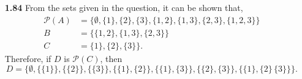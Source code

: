 \documentclass[12pt]{article}
\newcommand{\pow}[1]{ \mathcal{P}\left(#1\right) }
\begin{document}
\begin{itemize}
    \item[\bf{1.84}] From the sets given in the question, it can be shown that,
        \begin{align*}
            \pow{A} &=\{\emptyset,\{1\},\{2\},\{3\}, \{1,2\},\{1,3\},\{2,3\},\{1,2,3\}\} 
            \\
            B &=\{\{1,2\},\{1,3\},\{2,3\}\}
            \\
            C &=\{1\},\{2\},\{3\}\}.
        \end{align*}
    Therefore, if $D$ is $\pow{C}$, then
        \begin{equation*}
            D=\{\emptyset,\{\{1\}\},\{\{2\}\},\{\{3\}\},\{\{1\},\{2\}\},\{\{1\},\{3\}\}, \{\{2\},\{3\}\}, \{\{1\},\{2\}\, \{3\}\}\}.
        \end{equation*}
    \end{itemize}
    
\end{document}
